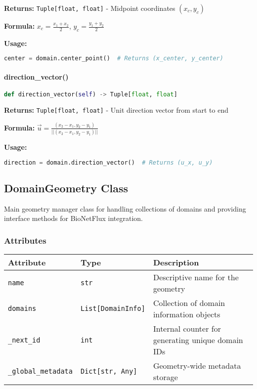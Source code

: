\textbf{Returns:} \texttt{Tuple[float, float]} - Midpoint coordinates $(x_c, y_c)$

\textbf{Formula:} $x_c = \frac{x_1 + x_2}{2}$, $y_c = \frac{y_1 + y_2}{2}$

\textbf{Usage:}
\begin{lstlisting}[language=Python]
center = domain.center_point()  # Returns (x_center, y_center)
\end{lstlisting}

\paragraph{direction\_vector()}
\begin{lstlisting}[language=Python, caption=Direction Vector Calculation]
def direction_vector(self) -> Tuple[float, float]
\end{lstlisting}

\textbf{Returns:} \texttt{Tuple[float, float]} - Unit direction vector from start to end

\textbf{Formula:} $\vec{u} = \frac{(x_2-x_1, y_2-y_1)}{||(x_2-x_1, y_2-y_1)||}$

\textbf{Usage:}
\begin{lstlisting}[language=Python]
direction = domain.direction_vector()  # Returns (u_x, u_y)
\end{lstlisting}

\subsection{DomainGeometry Class}
\label{subsec:domaingeometry_class}

Main geometry manager class for handling collections of domains and providing interface methods for BioNetFlux integration.

\subsubsection{Attributes}

\begin{longtable}{|p{3cm}|p{2.5cm}|p{7cm}|}
\hline
\textbf{Attribute} & \textbf{Type} & \textbf{Description} \\
\hline
\endhead

\texttt{name} & \texttt{str} & Descriptive name for the geometry \\
\hline

\texttt{domains} & \texttt{List[DomainInfo]} & Collection of domain information objects \\
\hline

\texttt{\_next\_id} & \texttt{int} & Internal counter for generating unique domain IDs \\
\hline

\texttt{\_global\_metadata} & \texttt{Dict[str, Any]} & Geometry-wide metadata storage \\
\hline

\end{longtable}

